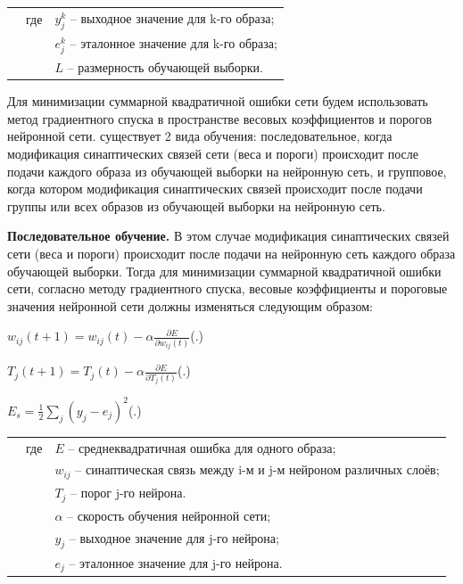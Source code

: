 {	\begin{tabular}{p{}p{}p{}}
		& где  & $y_{j}^{k}$ {--} выходное значение для k-го образа; \\
		&      & $e_{j}^{k}$ {--} эталонное значение для k-го образа; \\
		&      & $L$ {--} размерность обучающей выборки. \\
	\end{tabular}
	
	\par \redline Для минимизации суммарной квадратичной ошибки сети будем использовать метод градиентного спуска в пространстве весовых коэффициентов и порогов нейронной сети. существует 2 вида обучения: последовательное, когда модификация
	синаптических связей сети (веса и пороги) происходит после подачи
	каждого образа из обучающей выборки на нейронную сеть, и групповое, когда котором модификация синаптических связей происходит после подачи группы или всех образов из
	обучающей выборки на нейронную сеть. 
	
	\par \redline \textbf{Последовательное обучение. } В этом случае модификация синаптических связей сети (веса и пороги) происходит после подачи на нейронную сеть каждого образа обучающей выборки. Тогда для минимизации суммарной квадратичной
	ошибки сети, согласно методу градиентного спуска, весовые коэффициенты и пороговые значения нейронной сети должны изменяться следующим образом:
	
	\formulaspace \par \redline 
	$w_{ij}(t+1) = w_{ij}(t) - \alpha \frac{\partial E}{\partial w_{ij}(t)} $\hfill (\thechaptercntr .\theformulacntr) \redline
	\formulaspace \addtocounter{formulacntr}{1}
	
	\formulaspace \par \redline 
	$T_{j}(t+1) = T_{j}(t) - \alpha \frac{\partial E}{\partial T_{j}(t)} $\hfill (\thechaptercntr .\theformulacntr) \redline
	\formulaspace \addtocounter{formulacntr}{1}
	
	\formulaspace \par \redline 
	$E_{s} = \frac{1}{2} \sum \limits _{j}^{} (y_{j} - e_{j})^{2} $\hfill (\thechaptercntr .\theformulacntr) \redline
	\formulaspace \addtocounter{formulacntr}{1}
	
	\begin{tabular}{p{}p{}p{}}
		& где  & $E$ {--} среднеквадратичная ошибка для одного образа; \\
		&      &  $w_{ij}$ {--} синаптическая связь между i-м и j-м нейроном различных слоёв; \\
		&      & $T_{j}$ {--} порог j-го нейрона. \\
		&      & $\alpha$ {--} скорость обучения нейронной сети; \\
		&      & $y_{j}$ {--} выходное значение для j-го нейрона; \\
		&      & $e_{j}$ {--} эталонное значение для j-го нейрона. \\
	\end{tabular}
	
}
